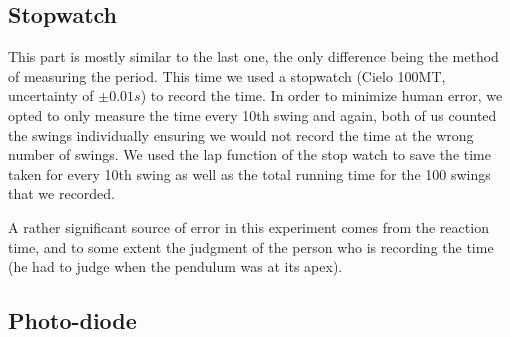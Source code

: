 \documentclass[%
 reprint,
 amsmath,amssymb,
 aps,
]{revtex4-1}
\begin{document}
    \subsection{\label{subsect:exp_stopwatch}Stopwatch}
        This part is mostly similar to the last one, the only difference being the method of measuring the period. This time we used a stopwatch (Cielo 100MT, uncertainty of $\pm 0.01s$) to record the time. In order to minimize human error, we opted to only measure the time every 10th swing and again, both of us counted the swings individually ensuring we would not record the time at the wrong number of swings. We used the lap function of the stop watch to save the time taken for every 10th swing as well as the total running time for the 100 swings that we recorded.

        A rather significant source of error in this experiment comes from the reaction time, and to some extent the judgment of the person who is recording the time (he had to judge when the pendulum was at its apex).


	\subsection{\label{subsect:exp_photodiode}Photo-diode}
\end{document}
